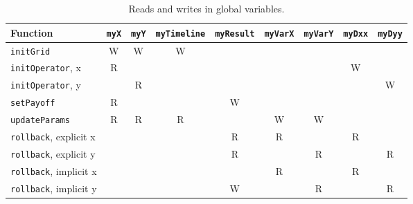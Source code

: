 \documentclass[a4paper]{article}
\begin{document}
\begin{table}
    \centering
    \begin{tabular}{lcccccccc}
        \toprule
        \textbf{Function}             & \texttt{myX} & \texttt{myY} & \texttt{myTimeline} & \texttt{myResult} & \texttt{myVarX} & \texttt{myVarY} & \texttt{myDxx} & \texttt{myDyy} \\
        \midrule
        \texttt{initGrid}             & W            & W            & W                   &                   &                 &                 &                &                \\
        \texttt{initOperator}, x      & R            &              &                     &                   &                 &                 & W              &                \\
        \texttt{initOperator}, y      &              & R            &                     &                   &                 &                 &                & W              \\
        \texttt{setPayoff}            & R            &              &                     & W                 &                 &                 &                &                \\
        \texttt{updateParams}         & R            & R            & R                   &                   & W               & W               &                &                \\
        \texttt{rollback}, explicit x &              &              &                     & R                 & R               &                 & R              &                \\
        \texttt{rollback}, explicit y &              &              &                     & R                 &                 & R               &                & R              \\
        \texttt{rollback}, implicit x &              &              &                     &                   & R               &                 & R              &                \\
        \texttt{rollback}, implicit y &              &              &                     & W                 &                 & R               &                & R              \\
        \bottomrule
    \end{tabular}
    \caption{Reads and writes in global variables.}
    \label{tbl:rw}
\end{table}
\end{document}
